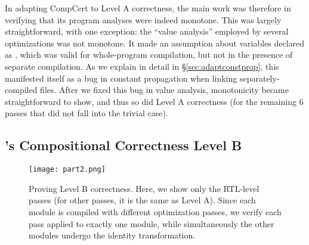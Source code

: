 In adapting CompCert to Level A correctness, the main work was
therefore in verifying that its program analyses were indeed monotone.
This was largely straightforward, with one exception: the ``value
analysis'' employed by several optimizations was not monotone.  It
made an assumption about variables declared as ,
which was valid for whole-program compilation, but not in the presence
of separate compilation.  As we explain in detail in
\S\ref{sec:adaptconstprop}, this manifested itself as a bug in
constant propagation when linking separately-compiled files.  After we
fixed this bug in value analysis, monotonicity became straightforward
to show, and thus so did Level A correctness (for the remaining 6
passes that did not fall into the trivial case).











\subsection{\sepcomp{}'s Compositional Correctness Level B}
\label{sec:overview:LevelB}

\begin{figure}[!t]
\begin{center}
\texttt{[image: part2.png]}
\end{center}
\caption{Proving Level B correctness.  Here, we show only the
  RTL-level passes (for other passes, it is the same as Level A).
  Since each module is compiled with different optimization passes, we
  verify each pass applied to exactly one module, while simultaneously
  the other modules undergo the identity transformation.}
\label{fig:LevelB}
\end{figure}

